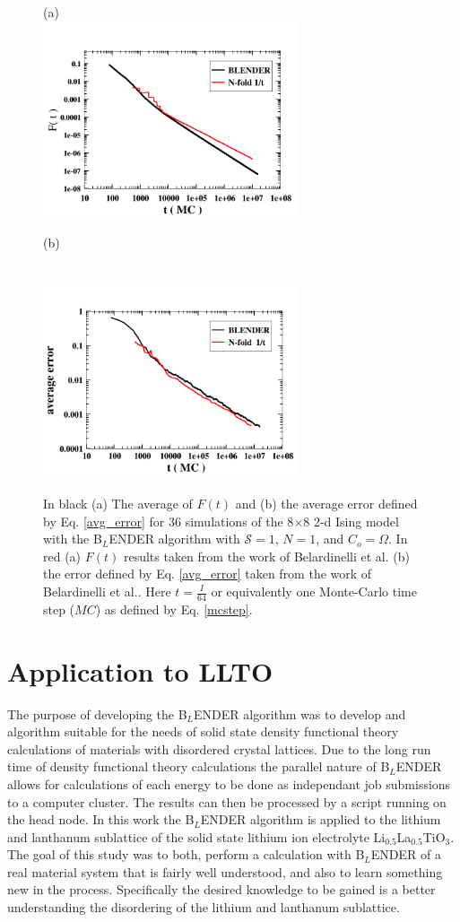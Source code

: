 \documentclass[aps,pre,reprint,superscriptaddress,showkeys]{revtex4-1}
\begin{document}
\begin{figure}
(a)\\
\includegraphics[width=7.5cm]{./figures/Avg_F_8X8.png}
\centerline{(b)}\\
\includegraphics[width=7.5cm]{./figures/Avg_error_8X8.png}
\caption{ In black (a) The average of $F(t)$ and (b) the average error defined by Eq. \ref{avg_error}  for 36 simulations of the 8$\times$8 2-d Ising model with the B$_L$ENDER algorithm with $\mathcal{S}=1$, $N=1$, and $C_o = \Omega$. In red (a) $F(t)$ results taken from the work of Belardinelli et al. \cite{saturation} (b) the error defined by Eq. \ref{avg_error} taken from the  work of Belardinelli et al.. Here $t = \frac{I}{64}$ or equivalently one Monte-Carlo time step ($MC$) as defined by Eq. \ref{mcstep}.\label{FtandA} }
\end{figure}

\section{Application to LLTO}
The purpose of developing the B$_L$ENDER algorithm was to develop and algorithm suitable for the needs of solid state density functional theory calculations of materials with disordered crystal lattices.  Due to the long run time of density functional theory calculations  the parallel nature of B$_L$ENDER allows for calculations of each energy to be done as independant job submissions to a computer cluster. The results can then be processed by a script running on the head node.  In this work the B$_L$ENDER algorithm is applied to the lithium and lanthanum sublattice of the solid state lithium ion electrolyte  Li$_{0.5}$La$_{0.5}$TiO$_{3}$. The goal of this study was to both, perform a calculation with B$_L$ENDER of a real material system that is fairly well understood, and also to learn something new in the process.  Specifically the desired knowledge to be gained is a better understanding the disordering of the lithium and lanthanum sublattice. 
\end{document}
